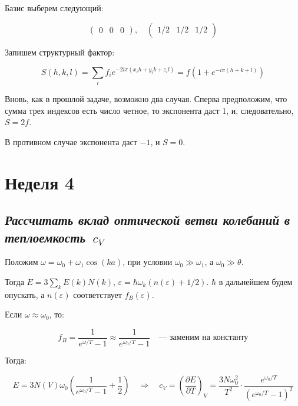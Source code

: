 \documentclass[a4paper, 12pt]{article}
\newcommand{\qrq}
{\ensuremath{\quad \Rightarrow \quad}} %
\begin{document}
Базис выберем следующий:

\begin{equation}
\begin{pmatrix}
	0 & 0 & 0
\end{pmatrix}, \quad
\begin{pmatrix}
	1/2 & 1/2 & 1/2
\end{pmatrix}
\end{equation}


Запишем структурный фактор:

\begin{equation}
	S (h, k, l) = \sum\limits_i f_i e^{-2i\pi (x_i h + y_i k + z_i l)} = f(1 + e^{-i\pi (h + k + l)})
\end{equation}

Вновь, как в прошлой задаче, возможно два случая. Сперва предположим, что сумма трех индексов есть число четное, то экспонента даст 1, и, следовательно, $S = 2f$.

В противном случае экспонента даст $-1$, и $S = 0$.

\newpage

\section{Неделя 4}

\subsection{\textit{Рассчитать вклад оптической ветви колебаний в теплоемкость~$c_V$}}

Положим $\omega = \omega_0 + \omega_1 \cos(k a)$, при условии $\omega_0 \gg \omega_1$, а $\omega_0 \gg \theta$.

Тогда $E = 3 \sum\limits_k E(k) N(k)$, $\varepsilon =  \hbar \omega_k (n(\varepsilon) + 1/2)$. $\hbar$ в дальнейшем будем опускать, а $n(\varepsilon)$ соответствует $f_B(\varepsilon)$.

Если $\omega \approx \omega_0$, то:

\begin{equation}
	f_B = \frac{1}{e^{\omega/T} - 1} \approx \frac{1}{e^{\omega_0/T} - 1} \quad \text{--- заменим на константу}
\end{equation}

Тогда:

\begin{equation}
	E = 3 N(V) \omega_0 \left(\frac{1}{e^{\omega_0/T} - 1} + \frac{1}{2}\right) \qrq c_V = \left(\frac{\partial E}{\partial T}\right)_V = \frac{3 N \omega_0^2}{T^2} \cdot \frac{e^{\omega_0 / T}}{(e^{\omega_0 / T} - 1)^2}
\end{equation}
\end{document}
